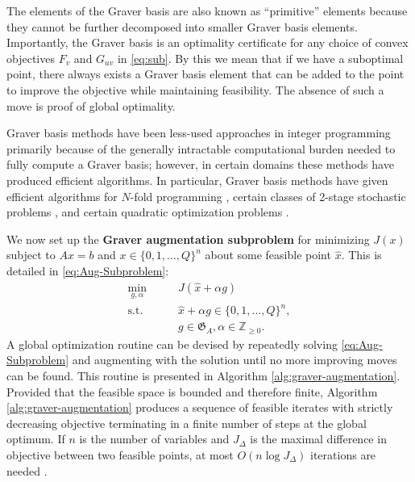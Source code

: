 \documentclass[pdflatex,sn-mathphys-num]{sn-jnl}%
\begin{document}
The elements of the Graver basis are also known as ``primitive'' elements because they cannot be further decomposed into smaller Graver basis elements.
Importantly, the Graver basis is an optimality certificate for any choice of convex objectives $F_v$ and $G_{uv}$ in \eqref{eq:sub}. 
By this we mean that if we have a suboptimal point, there always exists a Graver basis element that can be added to the point to improve the objective while maintaining feasibility. The absence of such a move is proof of global optimality. 

Graver basis methods have been less-used approaches in integer programming primarily because of the generally intractable computational burden needed to fully compute a Graver basis; however, in certain domains these methods have produced efficient algorithms. 
In particular, Graver basis methods have given efficient algorithms for $N$-fold programming \cite{de2008n,hemmecke2013n}, certain classes of 2-stage stochastic problems \cite{hemmecke2003decomposition, klein2020complexity}, and certain quadratic optimization problems \cite{lee2012quadratic}.

We now set up the \textbf{Graver augmentation subproblem} for minimizing $J(x)$ subject to $Ax = b$ and $x \in \{0,1,\ldots,Q\}^n$ about some feasible point $\hat{x}$. This is detailed in \eqref{eq:Aug-Subproblem}:
\begin{equation}
\begin{aligned}
    \min_{g, \alpha} \qquad & J(\hat{x} + \alpha g) \\
    \text{s.t.} \qquad & \hat{x} + \alpha g \in \{0,1,\ldots,Q\}^n,\\
                & g \in \mathfrak{G}_A, \alpha \in \mathbb{Z}_{\ge 0}.
\end{aligned} \label{eq:Aug-Subproblem}
\end{equation}
A global optimization routine can be devised by repeatedly solving \eqref{eq:Aug-Subproblem} and augmenting with the solution until no more improving moves can be found. This routine is presented in Algorithm \ref{alg:graver-augmentation}. Provided that the feasible space is bounded and therefore finite, Algorithm \ref{alg:graver-augmentation} produces a sequence of feasible iterates with strictly decreasing objective terminating in a finite number of steps at the global optimum. If $n$ is the number of variables and $J_{\Delta}$ is the maximal difference in objective between two feasible points, at most $O(n\log J_{\Delta})$ iterations are needed \cite{de2012algebraic}.
\end{document}
